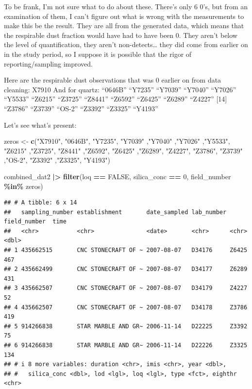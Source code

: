 \documentclass[
]{article}
\newenvironment{Shaded}{\begin{snugshade}}{\end{snugshade}}
\newcommand{\ConstantTok}[1]{\textcolor[rgb]{0.56,0.35,0.01}{#1}}
\newcommand{\DecValTok}[1]{\textcolor[rgb]{0.00,0.00,0.81}{#1}}
\newcommand{\FunctionTok}[1]{\textcolor[rgb]{0.13,0.29,0.53}{\textbf{#1}}}
\newcommand{\NormalTok}[1]{#1}
\newcommand{\OtherTok}[1]{\textcolor[rgb]{0.56,0.35,0.01}{#1}}
\newcommand{\SpecialCharTok}[1]{\textcolor[rgb]{0.81,0.36,0.00}{\textbf{#1}}}
\newcommand{\StringTok}[1]{\textcolor[rgb]{0.31,0.60,0.02}{#1}}
\begin{document}
To be frank, I'm not sure what to do about these. There's only 6 0's,
but from an examination of them, I can't figure out what is wrong with
the measurements to make this be the result. They are all from the
generated data, which means that the respirable dust fraction would have
had to have been 0. They aren't below the level of quantification, they
aren't non-detects\ldots{} they did come from earlier on in the study
period, so I suppose it is possible that the rigor of reporting/sampling
improved.

Here are the respirable dust observations that was 0 earlier on from
data cleaning: X7910 And for quartz: ``0646B'' ``Y7235'' ``Y7039''
``Y7040'' ``Y7026'' ``Y5533'' ``Z6215'' ``Z3725'' ``Z8441'' ``Z6592''
``Z6425'' ``Z6289'' ``Z4227'' {[}14{]} ``Z3786'' ``Z3739'' ``OS-2''
``Z3392'' ``Z3325'' ``Y4193''

Let's see what's present:

\begin{Shaded}
\begin{Highlighting}[]
\NormalTok{zeros }\OtherTok{\textless{}{-}} \FunctionTok{c}\NormalTok{(}\StringTok{"X7910"}\NormalTok{, }\StringTok{"0646B"}\NormalTok{, }\StringTok{"Y7235"}\NormalTok{, }\StringTok{"Y7039"}\NormalTok{ ,}\StringTok{"Y7040"}\NormalTok{ ,}\StringTok{"Y7026"}\NormalTok{ ,}\StringTok{"Y5533"}\NormalTok{, }\StringTok{"Z6215"}\NormalTok{ ,}\StringTok{"Z3725"}\NormalTok{, }\StringTok{"Z8441"}\NormalTok{ ,}\StringTok{"Z6592"}\NormalTok{, }\StringTok{"Z6425"}\NormalTok{ ,}\StringTok{"Z6289"}\NormalTok{, }\StringTok{"Z4227"}\NormalTok{,}
\StringTok{"Z3786"}\NormalTok{, }\StringTok{"Z3739"}\NormalTok{ ,}\StringTok{"OS{-}2"}\NormalTok{,  }\StringTok{"Z3392"}\NormalTok{ ,}\StringTok{"Z3325"}\NormalTok{, }\StringTok{"Y4193"}\NormalTok{) }

\NormalTok{combined\_dat2 }\SpecialCharTok{|\textgreater{}} 
    \FunctionTok{filter}\NormalTok{(loq }\SpecialCharTok{==} \ConstantTok{FALSE}\NormalTok{, }
\NormalTok{         silica\_conc }\SpecialCharTok{==} \DecValTok{0}\NormalTok{,}
\NormalTok{         field\_number }\SpecialCharTok{\%in\%}\NormalTok{ zeros) }
\end{Highlighting}
\end{Shaded}

\begin{verbatim}
## # A tibble: 6 x 14
##   sampling_number establishment       date_sampled lab_number field_number  time
##   <chr>           <chr>               <date>       <chr>      <chr>        <dbl>
## 1 435662515       CNC STONECRAFT OF ~ 2007-08-07   D34176     Z6425          467
## 2 435662499       CNC STONECRAFT OF ~ 2007-08-07   D34177     Z6289          431
## 3 435662507       CNC STONECRAFT OF ~ 2007-08-07   D34179     Z4227           52
## 4 435662507       CNC STONECRAFT OF ~ 2007-08-07   D34178     Z3786          419
## 5 914266838       STAR MARBLE AND GR~ 2006-11-14   D22225     Z3392           75
## 6 914266838       STAR MARBLE AND GR~ 2006-11-14   D22226     Z3325          134
## # i 8 more variables: duration <chr>, imis <chr>, year <dbl>,
## #   silica_conc <dbl>, lod <lgl>, loq <lgl>, type <fct>, eighthr <chr>
\end{verbatim}
\end{document}
